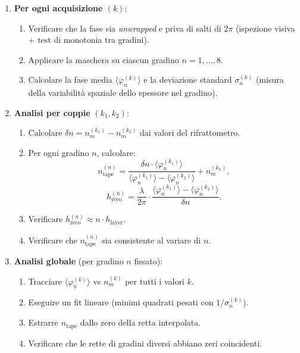 \begin{enumerate}
  \item \textbf{Per ogni acquisizione $(k)$}:
  \begin{enumerate}
    \item Verificare che la fase sia \textit{unwrapped} e priva di salti di
          $2\pi$ (ispezione visiva + test di monotonia tra gradini).
    \item Applicare la maschera su ciascun gradino $n = 1,\dots,8$.
    \item Calcolare la fase media $\langle\varphi_n^{(k)}\rangle$ e la
          deviazione standard $\sigma_n^{(k)}$ (misura della variabilità
          spaziale dello spessore nel gradino).
  \end{enumerate}

  \item \textbf{Analisi per coppie} $(k_1, k_2)$:
  \begin{enumerate}
    \item Calcolare $\delta n = n_m^{(k_1)} - n_m^{(k_2)}$ dai valori del
          rifrattometro.
    \item Per ogni gradino $n$, calcolare:
    \[
      n_\text{tape}^{(n)} = \frac{\delta n \cdot \langle\varphi_n^{(k_1)}\rangle}
      {\langle\varphi_n^{(k_1)}\rangle - \langle\varphi_n^{(k_2)}\rangle}
      + n_m^{(k_1)},
    \]
    \[
      h_\text{reco}^{(n)} = \frac{\lambda}{2\pi}\cdot
      \frac{\langle\varphi_n^{(k_1)}\rangle - \langle\varphi_n^{(k_2)}\rangle}{\delta n}.
    \]
    \item Verificare $h_\text{reco}^{(n)} \approx n \cdot h_\text{layer}$.
    \item Verificare che $n_\text{tape}^{(n)}$ sia consistente al variare di $n$.
  \end{enumerate}

  \item \textbf{Analisi globale} (per gradino $n$ fissato):
  \begin{enumerate}
    \item Tracciare $\langle\varphi_n^{(k)}\rangle$ vs $n_m^{(k)}$
          per tutti i valori $k$.
    \item Eseguire un fit lineare (minimi quadrati pesati con $1/\sigma_n^{(k)}$).
    \item Estrarre $n_\text{tape}$ dallo zero della retta interpolata.
    \item Verificare che le rette di gradini diversi abbiano zeri coincidenti.
  \end{enumerate}
\end{enumerate}

